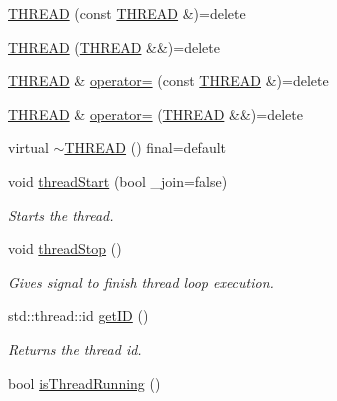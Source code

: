 \begin{DoxyCompactItemize}
\item 
\hyperlink{class_marox_1_1_threading_1_1_t_h_r_e_a_d_a16c5cd80f37a3ae9712a2fb066a1ad91}{T\+H\+R\+E\+A\+D} (const \hyperlink{class_marox_1_1_threading_1_1_t_h_r_e_a_d}{T\+H\+R\+E\+A\+D} \&)=delete
\item 
\hyperlink{class_marox_1_1_threading_1_1_t_h_r_e_a_d_ae257842977ce525e5cf7f21ed3d504d3}{T\+H\+R\+E\+A\+D} (\hyperlink{class_marox_1_1_threading_1_1_t_h_r_e_a_d}{T\+H\+R\+E\+A\+D} \&\&)=delete
\item 
\hyperlink{class_marox_1_1_threading_1_1_t_h_r_e_a_d}{T\+H\+R\+E\+A\+D} \& \hyperlink{class_marox_1_1_threading_1_1_t_h_r_e_a_d_a9eb64141a6ff33f4a91a49866ecb2d70}{operator=} (const \hyperlink{class_marox_1_1_threading_1_1_t_h_r_e_a_d}{T\+H\+R\+E\+A\+D} \&)=delete
\item 
\hyperlink{class_marox_1_1_threading_1_1_t_h_r_e_a_d}{T\+H\+R\+E\+A\+D} \& \hyperlink{class_marox_1_1_threading_1_1_t_h_r_e_a_d_a91655aaeed2abb94e6f44ebc730db483}{operator=} (\hyperlink{class_marox_1_1_threading_1_1_t_h_r_e_a_d}{T\+H\+R\+E\+A\+D} \&\&)=delete
\item 
virtual \hyperlink{class_marox_1_1_threading_1_1_t_h_r_e_a_d_a136e018eea1bd6d9631ce7856e5cb7f6}{$\sim$\+T\+H\+R\+E\+A\+D} () final=default
\item 
void \hyperlink{class_marox_1_1_threading_1_1_t_h_r_e_a_d_a24d3a233c68ec1861c2ea2fd60adc440}{thread\+Start} (bool \+\_\+join=false)
\begin{DoxyCompactList}\small\item\em Starts the thread. \end{DoxyCompactList}\item 
void \hyperlink{class_marox_1_1_threading_1_1_t_h_r_e_a_d_a32ea0b67f9f50ca39a46519b0da8d5e7}{thread\+Stop} ()
\begin{DoxyCompactList}\small\item\em Gives signal to finish thread loop execution. \end{DoxyCompactList}\item 
std\+::thread\+::id \hyperlink{class_marox_1_1_threading_1_1_t_h_r_e_a_d_a0c70c64d79b5063fe22023359dc13571}{get\+I\+D} ()
\begin{DoxyCompactList}\small\item\em Returns the thread id. \end{DoxyCompactList}\item 
bool \hyperlink{class_marox_1_1_threading_1_1_t_h_r_e_a_d_abb2bf027b066903e4dd5a9fb20948310}{is\+Thread\+Running} ()

\end{DoxyCompactItemize}
